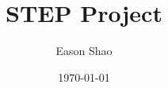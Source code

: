 \usepackage[a4paper,margin=1in]{geometry}

\usepackage{tocloft}
\renewcommand{\cftchapnumwidth}{3em}
\renewcommand{\cftsecnumwidth}{4em}
\renewcommand{\cftsubsecnumwidth}{5em}

\usepackage{titlesec}
\titleformat{\chapter}[display]{\bfseries\Huge}{}{0em}{}
\titleformat{\section}[block]{\bfseries\Large}{\thechapter}{1em}{}
\titleformat{\subsection}[block]{\bfseries\large}{\thesection}{1em}{}

\usepackage{etoc}

\renewcommand{\chaptermark}[1]{\markboth{#1}{}}
\renewcommand{\sectionmark}[1]{\markright{#1}{}}

\newcommand{\SubOne}[1]{\numexpr#1-1}

\newcommand{\Year}[1]{
    \setcounter{chapter}{\SubOne{#1}}
    \chapter{Year #1}
    \thispagestyle{chapterOnly}
    \localtableofcontents
}
\newcommand{\Paper}[1]{
    \clearpage
    \setcounter{section}{\SubOne{#1}}
    \section{Paper #1}
    \localtableofcontents
}
\newcommand{\Question}[1]{
    \clearpage
    \setcounter{subsection}{\SubOne{#1}}
    \subsection{Question #1}
}

\newcommand{\WorkInProgress}{
    Work in progress.
}

\newcommand{\Title}{STEP Project}
\newcommand{\SubTitle}{A Solution Booklet to STEP questions}
\newcommand{\Author}{Eason Shao}
\newcommand{\Date}{\today}

\title{\Title}
\author{\Author}
\date{\Date}

